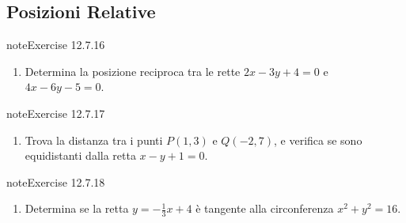 \documentclass[letterpaper,10pt,italian]{jupyterBook}
\begin{document}
\subsection{Posizioni Relative}
\label{\detokenize{ch/analytic_geometry/analytic_geometry_2d/sol:posizioni-relative}} \label{exercise:ch/analytic_geometry/analytic_geometry_2d/sol-exercise-15}

\begin{sphinxadmonition}{note}{Exercise 12.7.16}


\begin{enumerate}
%
\setcounter{enumi}{15}
\item {} 
\sphinxAtStartPar
Determina la posizione reciproca tra le rette \( 2x - 3y + 4 = 0 \) e \( 4x - 6y - 5 = 0 \).

\end{enumerate}
\end{sphinxadmonition}
 \label{exercise:ch/analytic_geometry/analytic_geometry_2d/sol-exercise-16}

\begin{sphinxadmonition}{note}{Exercise 12.7.17}


\begin{enumerate}
%
\setcounter{enumi}{16}
\item {} 
\sphinxAtStartPar
Trova la distanza tra i punti \( P(1, 3) \) e \( Q(-2, 7) \), e verifica se sono equidistanti dalla retta \( x - y + 1 = 0 \).

\end{enumerate}
\end{sphinxadmonition}
 \label{exercise:ch/analytic_geometry/analytic_geometry_2d/sol-exercise-17}

\begin{sphinxadmonition}{note}{Exercise 12.7.18}


\begin{enumerate}
%
\setcounter{enumi}{17}
\item {} 
\sphinxAtStartPar
Determina se la retta \( y = -\frac{1}{3}x + 4 \) è tangente alla circonferenza \( x^2 + y^2 = 16 \).

\end{enumerate}
\end{sphinxadmonition}
 \label{exercise:ch/analytic_geometry/analytic_geometry_2d/sol-exercise-18}
\end{document}
